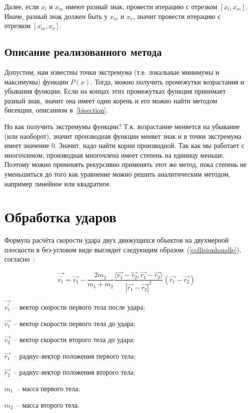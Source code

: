 Далее, если \(x_l\) и \(x_m\) имеют разный знак, провести итерацию с отрезком \([x_l, x_m]\).
Иначе, разный знак должен быть у  \(x_m\) и \(x_r\), значит провести итерацию с отрезком \([x_m, x_r]\).

\subsection{Описание реализованного метода}\label{polynomialequation}

Допустим, нам известны точки экстремума (т.е. локальные минимумы и максимумы) функции \(P(x)\).
Тогда, можно получить промежутки возрастания и убывания функции.
Если на концах этих промежутках функция принимает разный знак,
значит она имеет один корень и его можно найти методом бисекции, описанном в~\ref{bisection}.

Но как получить экстремумы функции? Т.к. возрастание меняется на убывание (или наоборот),
значит производная функции меняет знак и в точки экстремума имеет значение \(0\).
Значит, надо найти корни производной. Так как мы работает с многочленом, производная многочлена
имеет степень на единицу меньше. Поэтому можно применять рекурсивно применять этот же метод,
пока степень не уменьшиться до того как уравнение можно решить аналитическим методом,
например линейное или квадратное.

\section{Обработка ударов}

Формула расчёта скорости удара двух движущихся объектов на двухмерной плоскости в без-угловом виде
выглядит следующим образом~(\ref{collisionhandle}), согласно~\cite{wiki-ellastic-collision}:

\begin{equation}\label{collisionhandle}
  \vec{v_1^\prime} = \vec{v_1} - \frac{2 m_2}{m_1 + m_2}
  \frac{\langle \vec{v_1} - \vec{v_2}, \vec{r_1} - \vec{r_2} \rangle }{\left| \vec{r_1} - \vec{r_2} \right|^2}
  (\vec{r_1} - \vec{r_2})
\end{equation}

\begin{Underequation}
  \(\vec{v_1^\prime}\)~-- вектор скорости первого тела после удара;

  \(\vec{v_1}\)~-- вектор скорости первого тела до удара;

  \(\vec{v_2}\)~-- вектор скорости второго тела до удара;

  \(\vec{r_1}\)~-- радиус-вектор положения первого тела;

  \(\vec{r_2}\)~-- радиус-вектор положения второго тела;

  \(m_1\)~-- масса первого тела;

  \(m_2\)~-- масса второго тела.
\end{Underequation}

